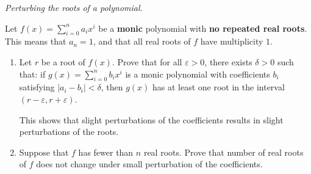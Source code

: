 \documentclass{article}
\theoremstyle{plain} %
\numberwithin{thm}{section} %
\theoremstyle{definition}
\begin{document}
        \textit{Perturbing the roots of a polynomial.}
    
    Let $f(x)=\sum_{i=0}^n a_ix^i$ be a \textbf{monic} polynomial with \textbf{no repeated real roots}. This means that $a_n=1$, and that all real roots of $f$ have multiplicity $1$.
    \begin{enumerate}[label=(\alph*)]
        \item 
        
        Let $r$ be a root of $f(x)$. Prove that for all $\varepsilon>0$, there exists $\delta>0$ such that: if $g(x)=\sum_{i=0}^n b_ix^i$ is a monic polynomial with coefficients $b_i$ satisfying $|a_i-b_i|<\delta$, then $g(x)$ has at least one root in the interval $(r-\varepsilon,r+\varepsilon)$.

        This shows that slight perturbations of the coefficients results in slight perturbations of the roots.
        
        \item Suppose that $f$ has fewer than $n$ real roots. Prove that number of real roots of $f$ does not change under small perturbation of the coefficients.
    \end{enumerate}
\end{document}
